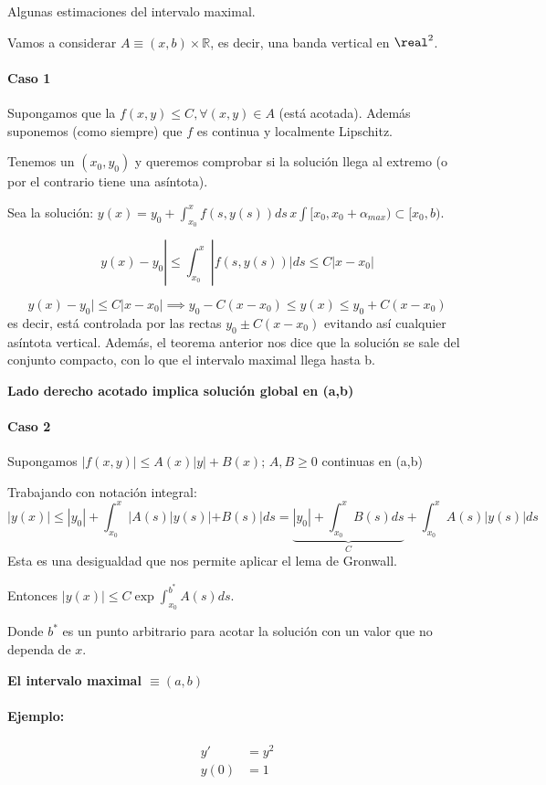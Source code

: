 Algunas estimaciones del intervalo maximal. 

Vamos a considerar $A \equiv (x,b)×ℝ$, es decir, una banda vertical en $\real^2$.

\paragraph{Caso 1}
Supongamos que la $f(x,y)\leq C,\forall (x,y)\in A$ (está acotada). Además suponemos (como siempre) que $f$ es continua y localmente Lipschitz.

Tenemos un $(x_0,y_0)$ y queremos comprobar si la solución llega al extremo (o por el contrario tiene una asíntota).

Sea la solución: $\displaystyle y(x) = y_0 + \int_{x_0}^{x} f(s,y(s))ds\, x\int [x_0,x_0+\alpha_{max})\subset [x_0,b)$.

\[y(x) - y_0| \leq \int_{x_0}^x |f(s,y(s))|ds \leq C |x-x_0|\]

\[y(x) - y_0|\leq C |x-x_0| \implies y_0 - C(x-x_0) \leq y(x) \leq y_0 + C(x - x_0)\] es decir, está controlada por las rectas $y_0 \pm C(x-x_0)$ evitando así cualquier asíntota vertical. Además, el teorema anterior nos dice que la solución se sale del conjunto compacto, con lo que el intervalo maximal llega hasta b.

\textbf{Lado derecho acotado implica solución global en (a,b)}

\paragraph{Caso 2} Supongamos $|f(x,y)|\leq A(x)|y| + B(x);\, A,B\ge 0$ continuas en (a,b)

Trabajando con notación integral:
\[|y(x)| \leq  |y_0| + \int_{x_0}^x | A(s)|y(s)| + B(s)|ds = \underbrace{|y_0| + \int_{x_0}^x B(s)ds}_{C} + \int_{x_0}^x A(s)|y(s)|ds \]
Esta es una desigualdad que nos permite aplicar el lema de Gronwall.

Entonces $|y(x)| \leq C \exp{\int_{x_0}^{b^{\ast}} A(s)ds }$.

Donde $b^{\ast}$ es un punto arbitrario para acotar la solución con un valor que no dependa de $x$.

\textbf{El intervalo maximal $\equiv (a,b)$}


\paragraph{Ejemplo:} 
\[\begin{array}{cc}
y'&=y^2\\
y(0)&=1
\end{array}\]

